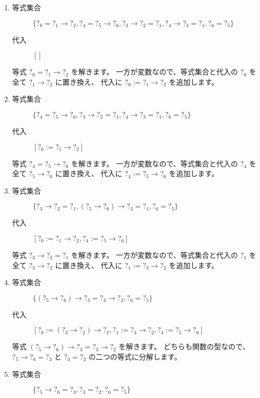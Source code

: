 \begin{enumerate}
  \item
    \begin{description}
      \item[等式集合]
        $\{?_0 = ?_1 \to ?_2, ?_4 = ?_5 \to ?_6, ?_3 \to ?_2 = ?_1, ?_4 \to ?_3 = ?_1, ?_6 = ?_5\}$
      \item[代入]
        $[]$
    \end{description}
    等式 $?_0 = ?_1 \to ?_2$ を解きます。
    一方が変数なので、等式集合と代入の $?_0$ を全て $?_1 \to ?_2$ に置き換え、
    代入に $?_0 := ?_1 \to ?_2$ を追加します。
  \item
    \begin{description}
      \item[等式集合]
        $\{?_4 = ?_5 \to ?_6, ?_3 \to ?_2 = ?_1, ?_4 \to ?_3 = ?_1, ?_6 = ?_5\}$
      \item[代入]
        $[?_0 := ?_1 \to ?_2]$
    \end{description}
    等式 $?_4 = ?_5 \to ?_6$ を解きます。
    一方が変数なので、等式集合と代入の $?_4$ を全て $?_5 \to ?_6$ に置き換え、
    代入に $?_4 := ?_5 \to ?_6$ を追加します。
  \item
    \begin{description}
      \item[等式集合]
        $\{?_3 \to ?_2 = ?_1, (?_5 \to ?_6) \to ?_3 = ?_1, ?_6 = ?_5\}$
      \item[代入]
        $[?_0 := ?_1 \to ?_2, ?_4 := ?_5 \to ?_6]$
    \end{description}
    等式 $?_3 \to ?_2 = ?_1$ を解きます。
    一方が変数なので、等式集合と代入の $?_1$ を全て $?_3 \to ?_2$ に置き換え、
    代入に $?_1 := ?_3 \to ?_2$ を追加します。
  \item
    \begin{description}
      \item[等式集合]
        $\{(?_5 \to ?_6) \to ?_3 = ?_3 \to ?_2, ?_6 = ?_5\}$
      \item[代入]
        $[?_0 := (?_3 \to ?_2) \to ?_2, ?_1 := ?_3 \to ?_2, ?_4 := ?_5 \to ?_6]$
    \end{description}
    等式 $(?_5 \to ?_6) \to ?_3 = ?_3 \to ?_2$ を解きます。
    どちらも関数の型なので、$?_5 \to ?_6 = ?_3$ と $?_3 = ?_2$ の二つの等式に分解します。
  \item
    \begin{description}
      \item[等式集合]
        $\{?_5 \to ?_6 = ?_3, ?_3 = ?_2, ?_6 = ?_5\}$

\end{description}
\end{enumerate}
